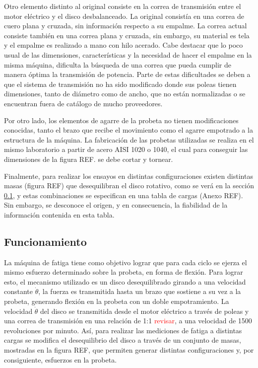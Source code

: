 Otro elemento distinto al original consiste en la correa de transmisión entre el motor eléctrico y el disco desbalanceado. La original consistía en una correa de cuero plana y cruzada, sin información respecto a su empalme. La correa actual consiste también en una correa plana y cruzada, sin embargo, su material es tela y el empalme es realizado a mano con hilo acerado. Cabe destacar que lo poco usual de las dimensiones, características y la necesidad de hacer el empalme en la misma máquina, dificulta la búsqueda de una correa que pueda cumplir de manera óptima la transmisión de potencia. Parte de estas dificultades se deben a que el sistema de transmisión no ha sido modificado donde sus poleas tienen dimensiones, tanto de diámetro como de ancho, que no están normalizadas o se encuentran fuera de catálogo de mucho proveedores. 

Por otro lado, los elementos de agarre de la probeta no tienen modificaciones conocidas, tanto el brazo que recibe el movimiento como el agarre empotrado a la estructura de la máquina. La fabricación de las probetas utilizadas se realiza en el mismo laboratorio a partir de acero AISI 1020 o 1040, el cual para conseguir las dimensiones de la figura REF. se debe cortar y tornear.

Finalmente, para realizar los ensayos en distintas configuraciones existen distintas masas (figura REF) que desequilibran el disco rotativo, como se verá en la sección \ref{sec:funcionamiento}, y estas combinaciones se especifican en una tabla de cargas (Anexo REF). Sin embargo, se desconoce el origen, y en consecuencia, la fiabilidad de la información contenida en esta tabla.

\subsection{Funcionamiento}
\label{sec:funcionamiento}
La máquina de fatiga tiene como objetivo lograr que para cada ciclo se ejerza el mismo esfuerzo determinado sobre la probeta, en forma de flexión. Para lograr esto, el mecanismo utilizado es un disco desequilibrado girando a una velocidad constante $\dot{\theta}$, la fuerza es transmitida hasta un brazo que sostiene a su vez a la probeta, generando flexión en la probeta con un doble empotramiento. La velocidad $\dot{\theta}$ del disco se transmitida desde el motor eléctrico a través de poleas y una correa de transmisión en una relación de 1:1 \textcolor{red}{revisar}, a una velocidad de 1500 revoluciones por minuto. Así, para realizar las mediciones de fatiga a distintas cargas se modifica el desequilibrio del disco a través de un conjunto de masas, mostradas en la figura REF, que permiten generar distintas configuraciones y, por consiguiente, esfuerzos en la probeta.

